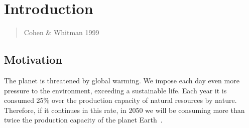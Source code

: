 


\chapter{Introduction} \label{chap1:introduction}


\begin{quotation}{\footnotesize{}
\begin{flushright}Cohen \& Whitman 1999\end{flushright}}\end{quotation}%


\section{Motivation} \label{sec1:motivation}

    The planet is threatened by global warming. We impose each day even more pressure to the environment, exceeding a sustainable life. Each year it is consumed 25\% over the production capacity of natural resources by nature. Therefore, if it continues in this rate, in 2050 we will be consuming more than twice the production capacity of the planet Earth~\cite{Townsend:2002:2050}. 
    
